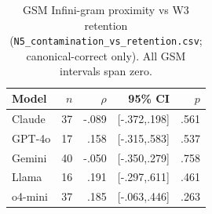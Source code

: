 \begin{table}[t]
\centering
\small
\caption{GSM Infini-gram proximity vs W3 retention
(\texttt{N5\_contamination\_vs\_retention.csv}; canonical-correct only).
All GSM intervals span zero.}
\label{tab:n5}
\begin{tabular}{lrrrr}
\toprule
Model & $n$ & $\rho$ & 95\% CI & $p$ \\
\midrule
Claude & 37 & -.089 & [-.372,.198] & .561 \\
GPT-4o & 17 & .158 & [-.315,.583] & .537 \\
Gemini & 40 & -.050 & [-.350,.279] & .758 \\
Llama & 16 & .191 & [-.297,.611] & .461 \\
o4-mini & 37 & .185 & [-.063,.446] & .263 \\
\bottomrule
\end{tabular}
\end{table}
